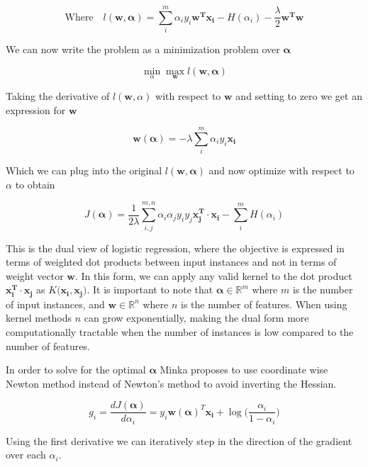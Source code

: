 \documentclass[11pt]{amsart}
\newcommand{\vek}[1]{\mathbf{#1}}
\begin{document}
\begin{equation}
\text{Where}\quad l(\vek{w}, \vek{\alpha}) = \sum_{i}^{m} \alpha_{i}y_{i}\vek{w^Tx_i} - H(\alpha_i) - \frac{\lambda}{2}\vek{w^Tw}
\end{equation}

We can now write the problem as a minimization problem over $\vek{\alpha}$

\begin{equation}
\min_{\alpha}\max_{\vek{w}} l(\vek{w}, \vek{\alpha})
\end{equation}

Taking the derivative of $l(\vek{w}, \alpha)$ with respect to $\vek{w}$ and setting to zero we get an expression for $\vek{w}$

\begin{equation}
\vek{w(\alpha)} = -\lambda\sum_{i}^{m}\alpha_{i}y_{i}\vek{x_i}
\end{equation}

Which we can plug into the original $l(\vek{w}, \vek{\alpha})$ and now optimize with respect to $\alpha$ to obtain

\begin{equation}
J(\vek{\alpha}) = \frac{1}{2\lambda}\sum_{i,j}^{m,n}\alpha_{i}\alpha_{j}y_{i}y_{j}\vek{x_{j}^{T}\cdot x_{i}} - \sum_{i}^{m}H(\alpha_i)
\end{equation}

This is the dual view of logistic regression, where the objective is expressed in terms of weighted dot products between input instances and not in terms of weight vector $\vek{w}$. In this form, we can apply any valid kernel to the dot product $\vek{x_i^T\cdot x_j}$ as $K(\vek{x_i, x_j)}$. It is important to note that $\vek{\alpha} \in \mathbb{R}^m$ where $m$ is the number of input instances, and $\vek{w} \in \mathbb{R}^n$ where $n$ is the number of features. When using kernel methods $n$ can grow exponentially, making the dual form more computationally tractable when the number of instances is low compared to the number of features. 

In order to solve for the optimal $\vek{\alpha}$ Minka proposes to use coordinate wise Newton method instead of Newton's method to avoid inverting the Hessian. 

\begin{equation}
g_i = \frac{dJ(\vek{\alpha})}{d\alpha_i} = y_i\vek{w(\alpha)}^T \vek{x_i} + \log \bigg(\frac{\alpha_i}{1-\alpha_i}\bigg)
\end{equation}

Using the first derivative we can iteratively step in the direction of the gradient over each $\alpha_i$.
\end{document}
